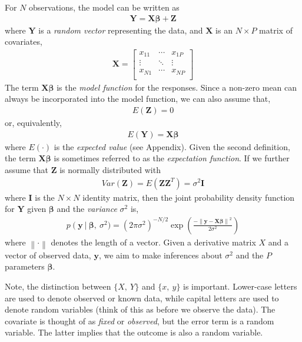 For \(N\) observations, the model can be written as
\begin{align}
\boldsymbol{Y} = \boldsymbol{X\beta} + \boldsymbol{Z}
\end{align}
where \(\boldsymbol{Y}\) is a \emph{random vector} representing the data,
and \(\boldsymbol{X}\) is an \(N \times P\) matrix of covariates,
\begin{align}
\boldsymbol{X} = 
\begin{bmatrix}
x_{11} & \cdots & x_{1P} \\
 \vdots & \ddots & \vdots \\
x_{N1} & \cdots & x_{NP} \\
\end{bmatrix}
\end{align}
The term \(\boldsymbol{X\beta}\) is the \emph{model function} for the
responses. Since a non-zero mean can always be incorporated into the
model function, we can also assume that,
\begin{align}
E\left( \boldsymbol{Z} \right) = 0
\end{align}
or, equivalently,
\begin{align}
E\left( \boldsymbol{Y} \right) = \boldsymbol{X\beta}
\end{align}
where \(E( \cdot )\) is the \emph{expected value} (see Appendix). Given
the second definition, the term \(\boldsymbol{X\beta}\) is sometimes
referred to as the \emph{expectation function}. If we further assume
that \(\boldsymbol{Z}\) is normally distributed with
\begin{align}
Var\left( \boldsymbol{Z} \right) = E\left( \boldsymbol{Z}\boldsymbol{Z}^{T} \right) = \sigma^{2}\boldsymbol{I}
\end{align}
where \(\boldsymbol{I}\) is the \(N \times N\) identity matrix, then the
joint probability density function for \(\boldsymbol{Y}\) given
\(\boldsymbol{\beta}\) and the \emph{variance} \(\sigma^{2}\) is,
\begin{align}
p\left( \boldsymbol{y\ } \right|\ \boldsymbol{\beta},\ \sigma^{2}) = \left( 2\pi\sigma^{2} \right)^{- N/2}\exp\left( \frac{- \left\| \boldsymbol{y} - \boldsymbol{X\beta} \right\|^{2}}{2\sigma^{2}} \right)
\end{align}
where \(\left\| \cdot \right\|\) denotes the length of a vector. Given a
derivative matrix \(X\) and a vector of observed data, \(\boldsymbol{y}\),
we aim to make inferences about \(\sigma^{2}\) and the \(P\) parameters
\(\boldsymbol{\beta}\).

Note, the distinction between \(\{ X,\ Y\}\) and \(\{ x,\ y\}\) is
important. Lower-case letters are used to denote observed or known data,
while capital letters are used to denote random variables (think of this
as before we observe the data). The covariate is thought of as
\emph{fixed} or \emph{observed}, but the error term is a random
variable. The latter implies that the outcome is also a random variable.

